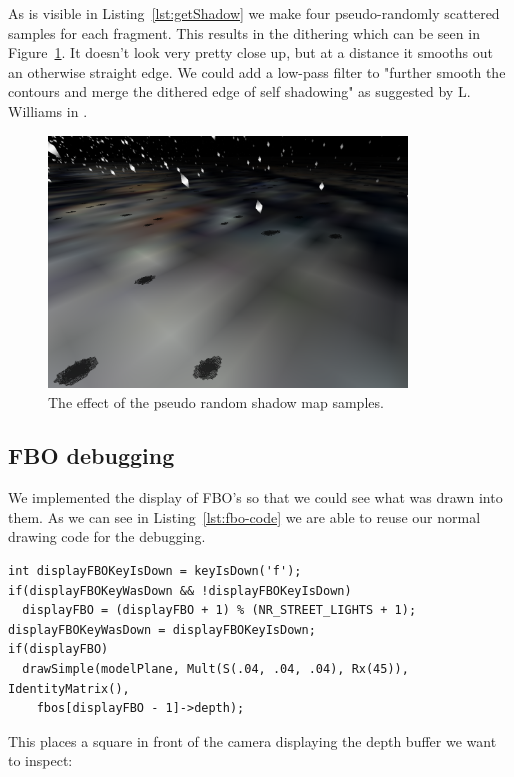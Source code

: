 \documentclass[a4paper,12pt]{article}
\begin{document}
\noindent
As is visible in Listing~\ref{lst:getShadow} we make four pseudo-randomly scattered samples for each fragment. This results in the dithering which can be seen in Figure~\ref{fig:dithering}. It doesn't look very pretty close up, but at a distance it smooths out an otherwise straight edge. We could add a low-pass filter to "further smooth the contours and merge the dithered edge of self shadowing" as suggested by L. Williams in \cite{shadow-maps}.

\begin{figure}[H]
  \centering
  \includegraphics[width=0.85\textwidth]{dithering}
  \caption{\label{fig:dithering} The effect of the pseudo random shadow map samples.}
\end{figure}

\subsection{FBO debugging}

We implemented the display of FBO's so that we could see what was drawn into them. As we can see in Listing~\ref{lst:fbo-code} we are able to reuse our normal drawing code for the debugging.

\begin{lstlisting}[label=lst:fbo-code,caption= Switching between the FBO's]
int displayFBOKeyIsDown = keyIsDown('f');
if(displayFBOKeyWasDown && !displayFBOKeyIsDown)
  displayFBO = (displayFBO + 1) % (NR_STREET_LIGHTS + 1);
displayFBOKeyWasDown = displayFBOKeyIsDown;
if(displayFBO)
  drawSimple(modelPlane, Mult(S(.04, .04, .04), Rx(45)), IdentityMatrix(),
    fbos[displayFBO - 1]->depth);
\end{lstlisting}

This places a square in front of the camera displaying the depth buffer we want to inspect:
\end{document}
